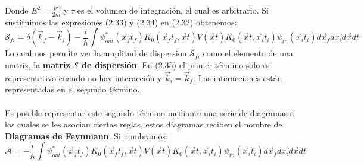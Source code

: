 Donde $E^2=\frac{p^2}{2m}$ y $\tau$ es el volumen de integración, el cual es arbitrario. Si sustituimos las expresiones (2.33) y (2.34) en (2.32) obtenemos:
\begin{equation}
\mathcal{S}_{fi}=\delta(\vec{k}_f-\vec{k}_i)-\frac{i}{\hbar}\int\psi_{out}^{*}(\vec{x}_{f}t_{f})K_{0}(\vec{x}_{f}t_{f},\vec{x}t)V(\vec{x}t)K_{0}(\vec{x}t,\vec{x}_{i}t_{i})\psi_{in}(\vec{x}_{i}t_{i})d\vec{x}_{f}d\vec{x_{i}}d\vec{x}dt
\end{equation}
Lo cual nos permite ver la amplitud de dispersion $\mathcal{S}_{fi}$ como el elemento de una matriz, la \textbf{matriz $\mathcal{S}$ de dispersión}. En (2.35) el primer término solo es representativo cuando no hay interacción y $\vec{k}_i=\vec{k}_f$. Las interacciones están representadas en el segundo término.\\
\\
Es posible representar este segundo término mediante una serie de diagramas a los cuales se les asocian ciertas reglas, estos diagramas reciben el nombre de \textbf{Diagramas de Feynmann}. Si nombramos:
\begin{equation}
\mathcal{A}=-\frac{i}{\hbar}\int\psi_{out}^{*}(\vec{x}_{f}t_{f})K_{0}(\vec{x}_{f}t_{f},\vec{x}t)V(\vec{x}t)K_{0}(\vec{x}t,\vec{x}_{i}t_{i})\psi_{in}(\vec{x}_{i}t_{i})d\vec{x}_{f}d\vec{x_{i}}d\vec{x}dt
\end{equation}

